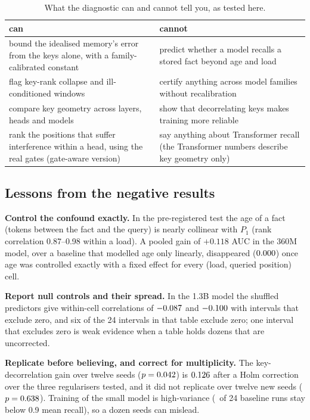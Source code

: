 \documentclass{article}
\begin{document}
\begin{table}[H]
  \caption{What the diagnostic can and cannot tell you, as tested here.}\label{tab:use}
  \centering\scriptsize\setlength{\tabcolsep}{4pt}
  \begin{tabular}{>{\raggedright\arraybackslash}p{7.6cm}>{\raggedright\arraybackslash}p{7.6cm}}
    \toprule
    can & cannot \\
    \midrule
    bound the idealised memory's error from the keys alone, with a family-calibrated constant & predict whether a model recalls a stored fact beyond age and load \\
    flag key-rank collapse and ill-conditioned windows & certify anything across model families without recalibration \\
    compare key geometry across layers, heads and models & show that decorrelating keys makes training more reliable \\
    rank the positions that suffer interference within a head, using the real gates (gate-aware version) & say anything about Transformer recall (the Transformer numbers describe key geometry only) \\
    \bottomrule
  \end{tabular}
\end{table}

\subsection{Lessons from the negative results}
\textbf{Control the confound exactly.} In the pre-registered test the age of a fact (tokens between the fact and the query) is nearly collinear with $P_1$ (rank correlation 0.87--0.98 within a load). A pooled gain of $+0.118$ AUC in the 360M model, over a baseline that modelled age only linearly, disappeared ($0.000$) once age was controlled exactly with a fixed effect for every (load, queried position) cell.

\textbf{Report null controls and their spread.} In the 1.3B model the shuffled predictors give within-cell correlations of $-0.087$ and $-0.100$ with intervals that exclude zero, and six of the 24 intervals in that table exclude zero; one interval that excludes zero is weak evidence when a table holds dozens that are uncorrected.

\textbf{Replicate before believing, and correct for multiplicity.} The key-decorrelation gain over twelve seeds ($p=0.042$) is $0.126$ after a Holm correction over the three regularisers tested, and it did not replicate over twelve new seeds ($p=0.638$). Training of the small model is high-variance (\poolFailBase\ of 24 baseline runs stay below 0.9 mean recall), so a dozen seeds can mislead.
\end{document}
